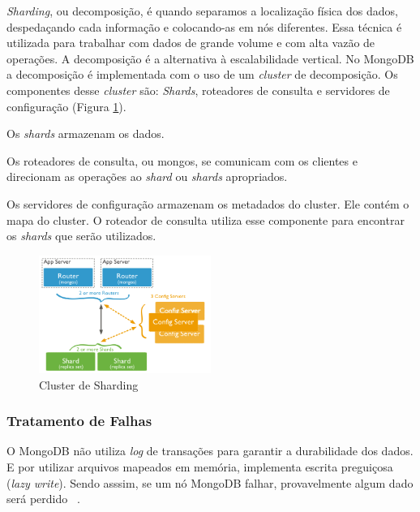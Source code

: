 \textit{Sharding}, ou decomposição, é quando separamos a localização física dos dados, despedaçando cada informação e colocando-as em nós diferentes. Essa técnica é utilizada para trabalhar com dados de grande volume e com alta vazão de operações. A decomposição é a alternativa à escalabilidade vertical. No MongoDB a decomposição é implementada com o uso de um \textit{cluster} de decomposição. Os componentes desse \textit{cluster} são: \textit{Shards}, roteadores de consulta e servidores de configuração (Figura \ref{fig:sharding}).

Os \textit{shards} armazenam os dados.

Os roteadores de consulta, ou mongos, se comunicam com os clientes e direcionam as operações ao \textit{shard} ou \textit{shards} apropriados.

Os servidores de configuração armazenam os metadados do cluster. Ele contém o mapa do cluster. O roteador de consulta utiliza esse componente para encontrar os \textit{shards} que serão utilizados.

	\begin{figure}[!htbp]
		\begin{center}
			\includegraphics[width=0.5\textwidth]{sharding}
		\end{center}
		\caption{Cluster de Sharding ~\cite{sitemongodb}}
		\label{fig:sharding}
	\end{figure}

\subsubsection{Tratamento de Falhas}

O MongoDB não utiliza \textit{log}  de transações para garantir a durabilidade dos dados. E por utilizar arquivos mapeados em memória, implementa escrita preguiçosa (\textit{lazy write}). Sendo asssim, se um nó MongoDB falhar, provavelmente algum dado será perdido ~\cite{Orendanalysisand}.